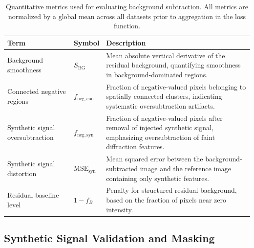 \documentclass[iucr]{iucrjournals}
\begin{document}
\begin{table}[t]
\caption{Quantitative metrics used for evaluating background subtraction. 
All metrics are normalized by a global mean across all datasets prior to aggregation in the loss function.}
\label{tab:loss_terms}
\centering
\small
\setlength{\tabcolsep}{6pt}
\renewcommand{\arraystretch}{1.1}
\begin{tabular}{@{}llp{7cm}@{}}
\toprule
\textbf{Term} & \textbf{Symbol} & \textbf{Description} \\
\midrule
Background smoothness & $S_{\mathrm{BG}}$ & Mean absolute vertical derivative of the residual background, quantifying smoothness in background-dominated regions. \\
Connected negative regions & $f_{\mathrm{neg,con}}$ & Fraction of negative-valued pixels belonging to spatially connected clusters, indicating systematic oversubtraction artifacts. \\
Synthetic signal oversubtraction & $f_{\mathrm{neg,syn}}$ & Fraction of negative-valued pixels after removal of injected synthetic signal, emphasizing oversubtraction of faint diffraction features. \\
Synthetic signal distortion & $\mathrm{MSE}_{\mathrm{syn}}$ & Mean squared error between the background-subtracted image and the reference image containing only synthetic features. \\
Residual baseline level & $1 - f_{B}$ & Penalty for structured residual background, based on the fraction of pixels near zero intensity. \\
\bottomrule
\end{tabular}
\end{table}




\subsection{Synthetic Signal Validation and Masking}

\end{document}
